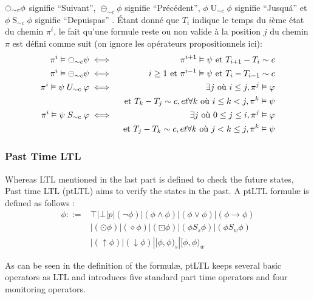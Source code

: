 $\fullmoon_{\sim{}c}\phi$ signifie ``Suivant'', $\circleddash_{\sim{}c}\phi$ signifie ``Précédent'', $\phi \mathrel{U}_{\sim{}c} \phi$ signifie ``Jusqu\'a'' et $\phi \mathrel{S}_{\sim{}c} \phi$ signifie ``Depuispas'' \citep{chang1994compositional}. Étant donné que $T_i$ indique le temps du $i$ème état du chemin $\pi^i$, le fait qu'une formule reste ou non valide à la position $j$ du chemin $\pi$ est défini comme suit (on ignore les opérateurs propositionnels ici):
\begin{eqnarray*}
\pi^i \vDash \fullmoon_{\sim{}c}\psi & \iff & \pi^{i+1} \vDash \psi \mbox{ et } T_{i+1} - T_i \sim c \\
\pi^i \vDash \circleddash_{\sim{}c}\psi & \iff & i \geq 1 \mbox{ et } \pi^{i-1} \vDash \psi \mbox{ et } T_i - T_{i-1} \sim c \\
\pi^i \vDash \psi \mathrel{U}_{\sim{}c} \varphi & \iff & \exists j \mbox{ où } i \leq j, \pi^j \vDash \varphi \\ & & \mbox{ et } T_k - T_j \sim c, et \forall k \mbox{ où } i \leq k < j, \pi^k \vDash \psi \\
\pi^i \vDash \psi \mathrel{S}_{\sim{}c} \varphi & \iff & \exists j \mbox{ où } 0 \leq j \leq i, \pi^j \vDash \varphi \\ & & \mbox{ et } T_j - T_k \sim c, et \forall k \mbox{ où } j < k \leq j, \pi^k \vDash \psi \\
\end{eqnarray*}

\subsubsection{Past Time LTL}

Whereas LTL mentioned in the last part is defined to check the future states, Past time LTL (ptLTL) aims to verify the states in the past. A ptLTL formul\ae{} is defined as follows \citep{havelund2004efficient}:
\begin{align*}
\phi ::= & \top | \bot | p | (\neg\phi) | (\phi \wedge \phi) | (\phi \vee \phi) | (\phi \rightarrow \phi) \\
& | (\odot \phi) | (\diamond \phi) | (\boxdot \phi) | (\phi \mathrel{S_s} \phi) | (\phi \mathrel{S_w} \phi) \\
& | (\uparrow \phi) | (\downarrow \phi) | [\phi, \phi)_s | [\phi, \phi)_w
\end{align*}

As can be seen in the definition of the formul\ae{}, ptLTL keeps several basic operators as LTL and introduces five standard part time operators and four monitoring operators.

